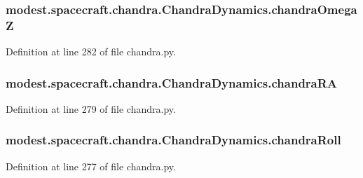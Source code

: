 \subsubsection[{\texorpdfstring{chandra\+OmegaZ}{chandraOmegaZ}}]{\setlength{\rightskip}{0pt plus 5cm}modest.\+spacecraft.\+chandra.\+Chandra\+Dynamics.\+chandra\+OmegaZ}\hypertarget{classmodest_1_1spacecraft_1_1chandra_1_1ChandraDynamics_acafb15d9219d4132e86060714b665f1b}{}\label{classmodest_1_1spacecraft_1_1chandra_1_1ChandraDynamics_acafb15d9219d4132e86060714b665f1b}


Definition at line 282 of file chandra.\+py.

\subsubsection[{\texorpdfstring{chandra\+RA}{chandraRA}}]{\setlength{\rightskip}{0pt plus 5cm}modest.\+spacecraft.\+chandra.\+Chandra\+Dynamics.\+chandra\+RA}\hypertarget{classmodest_1_1spacecraft_1_1chandra_1_1ChandraDynamics_a6d00225ae1c0689ba29e2acb5dd37b23}{}\label{classmodest_1_1spacecraft_1_1chandra_1_1ChandraDynamics_a6d00225ae1c0689ba29e2acb5dd37b23}


Definition at line 279 of file chandra.\+py.

\subsubsection[{\texorpdfstring{chandra\+Roll}{chandraRoll}}]{\setlength{\rightskip}{0pt plus 5cm}modest.\+spacecraft.\+chandra.\+Chandra\+Dynamics.\+chandra\+Roll}\hypertarget{classmodest_1_1spacecraft_1_1chandra_1_1ChandraDynamics_a59c8f88f8efb46c21dc9196d67ff2b1e}{}\label{classmodest_1_1spacecraft_1_1chandra_1_1ChandraDynamics_a59c8f88f8efb46c21dc9196d67ff2b1e}


Definition at line 277 of file chandra.\+py.

